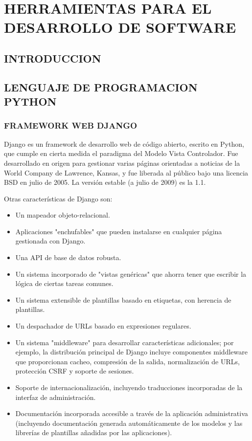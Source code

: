 

%
\chapter{HERRAMIENTAS PARA EL DESARROLLO DE SOFTWARE}
\section{INTRODUCCION}


\section{LENGUAJE DE PROGRAMACION PYTHON}

\subsection{FRAMEWORK WEB DJANGO}
Django es un framework de desarrollo web de código abierto, escrito en Python, que cumple en cierta medida el paradigma del Modelo Vista Controlador. Fue desarrollado en origen para gestionar varias páginas orientadas a noticias de la World Company de Lawrence, Kansas, y fue liberada al público bajo una licencia BSD en julio de 2005. La versión estable (a julio de 2009) es la 1.1.

Otras características de Django son:
\begin{itemize}

\item Un mapeador objeto-relacional.
\item Aplicaciones "enchufables" que pueden instalarse en cualquier página gestionada con Django.
\item Una API de base de datos robusta.
\item Un sistema incorporado de "vistas genéricas" que ahorra tener que escribir la lógica de ciertas tareas comunes.
\item Un sistema extensible de plantillas basado en etiquetas, con herencia de plantillas.
\item Un despachador de URLs basado en expresiones regulares.
\item Un sistema "middleware" para desarrollar características adicionales; por ejemplo, la distribución principal de Django incluye componentes middleware que proporcionan cacheo, compresión de la salida, normalización de URLs, protección CSRF y soporte de sesiones.
\item Soporte de internacionalización, incluyendo traducciones incorporadas de la interfaz de administración.
\item Documentación incorporada accesible a través de la aplicación administrativa (incluyendo documentación generada automáticamente de los modelos y las librerías de plantillas añadidas por las aplicaciones).

\end{itemize}


